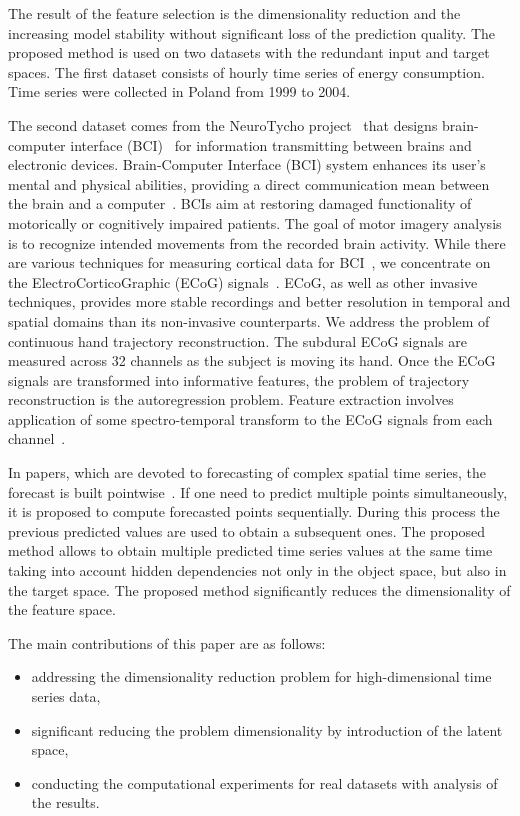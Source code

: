 \documentclass[runningheads]{llncs}
\begin{document}
The result of the feature selection is the dimensionality reduction and the increasing model stability without significant loss of the prediction quality.
The proposed method is used on two datasets with the redundant input and target spaces.
The first dataset consists of hourly time series of energy consumption. 
Time series were collected in Poland from 1999 to 2004.

The second dataset comes from the NeuroTycho project~\cite{neurotycho} that designs brain-computer interface (BCI)~\cite{millan2010combining,mason2007comprehensive} for information transmitting between brains and electronic devices.
Brain-Computer Interface (BCI) system enhances its user’s mental and physical abilities, providing a direct communication mean between the brain and a computer~\cite{millan2004brain}. 
BCIs aim at restoring damaged functionality of motorically or cognitively impaired patients.
The goal of motor imagery analysis is to recognize intended movements from the recorded brain activity. 
While there are various techniques for measuring cortical data for BCI~\cite{nicolas2012brain,amiri2013review}, we concentrate on the ElectroCorticoGraphic (ECoG) signals~\cite{eliseyev2016penalized}. 
ECoG, as well as other invasive techniques, provides more stable recordings and better resolution in temporal and spatial domains than its non-invasive counterparts.
We address the problem of continuous hand trajectory reconstruction. 
The subdural ECoG signals are measured across 32 channels as the subject is moving its hand.
Once the ECoG signals are transformed into informative features, the problem of trajectory reconstruction is the autoregression problem. 
Feature extraction involves application of some spectro-temporal transform to the ECoG signals from each channel~\cite{gasanov2017pls}.

In papers, which are devoted to forecasting of complex spatial time series, the forecast is built pointwise~\cite{box2015time,zhang2003time}.
If one need to predict multiple points simultaneously, it is proposed to compute forecasted points sequentially.
During this process the previous predicted values are used to obtain a subsequent ones.
The proposed method allows to obtain multiple predicted time series values at the same time taking into account hidden dependencies not only in the object space, but also in the target space.
The proposed method significantly reduces the dimensionality of the feature space.

The main contributions of this paper are as follows:
\begin{itemize}
	\item addressing the dimensionality reduction problem for high-dimensional time series data,
	\item significant reducing the problem dimensionality by introduction of the latent space,
	\item conducting the computational experiments for real datasets with analysis of the results.
\end{itemize}
\end{document}
